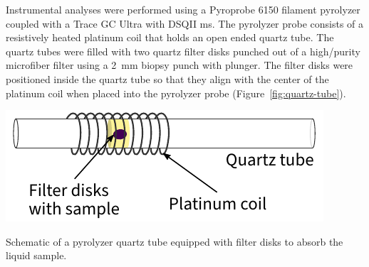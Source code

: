 Instrumental analyses were performed using a Pyroprobe 6150 filament pyrolyzer coupled with a Trace GC Ultra with DSQII \ac{ms}. The pyrolyzer probe consists of a resistively heated platinum coil that holds an open ended quartz tube. The quartz tubes were filled with two quartz filter disks punched out of a high\-/purity microfiber filter using a \SI{2}{\milli\meter} biopsy punch with plunger. The filter disks were positioned inside the quartz tube so that they align with the center of the platinum coil when placed into the pyrolyzer probe (Figure~\ref{fig:quartz-tube}).

\begin{marginfigure}
	\centering
	\includegraphics[width=\marginparwidth]{figures/quartz-tube}
	\caption{Schematic of a pyrolyzer quartz tube equipped with filter disks to absorb the liquid sample.}
	\label{fig:quartz-tube}
\end{marginfigure}

